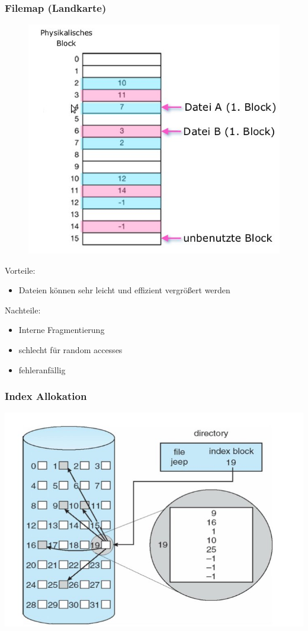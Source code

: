 \documentclass[a4paper, 10pt]{article}
\begin{document}
\subsubsection{Filemap (Landkarte)}
\begin{figure}
\includegraphics[scale=0.4]{filemap.jpg}
\end{figure}

Vorteile:
\begin{itemize}
\item Dateien k\"onnen sehr leicht und effizient vergr\"oßert werden
\end{itemize}
Nachteile:
\begin{itemize}
\item Interne Fragmentierung
\item schlecht f\"ur random accesses
\item fehleranf\"allig
\end{itemize}
\newpage
\subsubsection{Index Allokation}
\includegraphics[scale=0.5]{index_allocation.jpg}
\end{document}
